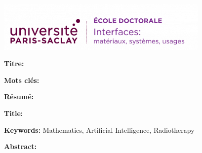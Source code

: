 \thispagestyle{empty}

\noindent 
\includegraphics[height=2.45cm]{preamble/ed-interfaces.png}
\vspace{1cm}

\small

\begin{mdframed}[linecolor=Prune,linewidth=1]
	
	\textbf{Titre:} \frenchtitle
	
	\vspace{1mm} \noindent
	\textbf{Mots clés:} \frenchKeyWords 
	
	\begin{multicols}{2}
		\noindent \textbf{Résumé:}
		\lipsum[1-2]
		
	\end{multicols}
	
\end{mdframed}

\vspace{8mm}

\begin{mdframed}[linecolor=Prune,linewidth=1]
	
	\textbf{Title:} \englishtitle
	
	\vspace{1mm} \noindent
	\textbf{Keywords:} Mathematics, Artificial Intelligence, Radiotherapy
	
	\begin{multicols}{2}
		\noindent \textbf{Abstract:} 
		\lipsum[1-2]
		
	\end{multicols}
\end{mdframed}



